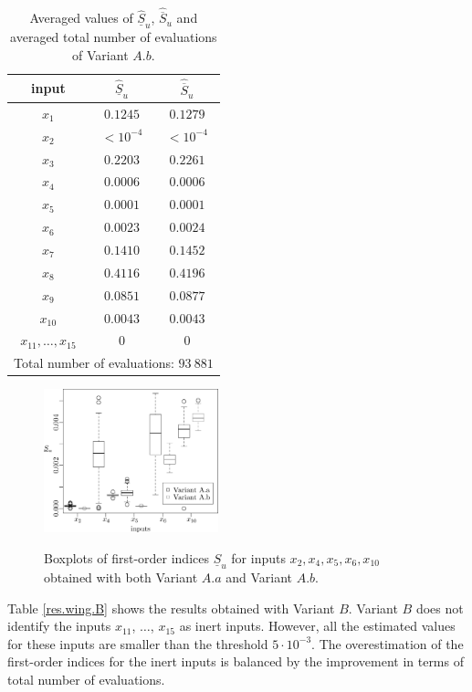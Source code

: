 \begin{table}[t]
\caption{Averaged values of $\widehat{\underline{S}}_u$, ${\widehat{\overline{S}}_u}$ and averaged total number of evaluations of Variant $A.b$.}
 \centering
\begin{tabular}{ccc}
\hline
  input & $\widehat{\underline{S}}_u$ & $\widehat{\overline{S}}_u$ \\ \hline
 $x_1$ & $0.1245$ & $0.1279$  \\ \hline
 $x_2$ & $< 10^{-4}$ & $< 10^{-4}$  \\ \hline
 $x_3$ & $0.2203$ & $0.2261$  \\ \hline
 $x_4$ & $0.0006$ & $0.0006$  \\ \hline
 $x_5$ & $0.0001$ & $0.0001$  \\ \hline
 $x_6$ & $0.0023$ & $0.0024$  \\ \hline 
 $x_7$ & $0.1410$ & $0.1452$  \\ \hline
 $x_8$ & $0.4116$ & $0.4196$  \\ \hline
 $x_9$ & $0.0851$ & $0.0877$  \\ \hline
 $x_{10}$ & $0.0043$ & $0.0043$  \\ \hline
 $x_{11},\dots,x_{15}$ & $0$ & $0$  \\ \hline
\hline
\multicolumn{3}{l}{Total number of evaluations: $93 \ 881$} \\ \hline 
\end{tabular}
\label{res.wing.Ab}
\end{table}

\begin{figure}[t]
\caption{Boxplots of first-order indices $\underline{S}_u$ for inputs $x_2,x_4,x_5,x_6,x_{10}$ obtained with both Variant $A.a$ and Variant $A.b$.}
\vspace*{0.2cm}
\centering
\includegraphics[width=0.45\textwidth]{wingweight_box.eps}
\label{boxplots.wing}
\end{figure}

Table \ref{res.wing.B} shows the results obtained with Variant $B$. Variant $B$ does not identify the inputs $x_{11}$, $\dots$, $x_{15}$ as inert inputs. However, all the estimated values for these inputs are smaller than the threshold $5\cdot 10^{-3}$. The overestimation of the first-order indices for the inert inputs is balanced by the improvement in terms of total number of evaluations.

